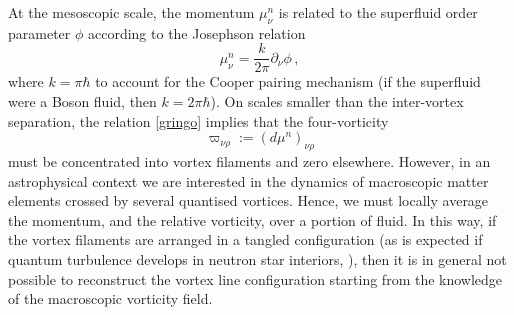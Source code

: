 \documentclass[usenatbib%
]{mnras}
\begin{document}
At the mesoscopic scale, the momentum $\mu^n_\nu$ is related to the superfluid order parameter $\phi$ according to the Josephson relation \citep{Carter2006}
\begin{equation}\label{gringo}
\mu^n_\nu = \dfrac{k}{2\pi} \partial_\nu \phi \, ,
\end{equation}
where $k=\pi \hbar$ to account for the Cooper pairing mechanism (if the superfluid were a Boson fluid, then $k=2\pi \hbar$). 
On scales smaller than the inter-vortex separation, the relation \eqref{gringo} implies that the four-vorticity 
\begin{equation}
\varpi_{\nu \rho} := (d\mu^n)_{\nu \rho}
\end{equation}
must be concentrated into vortex filaments and zero elsewhere.
However, in an astrophysical context we are interested in the dynamics of macroscopic matter elements crossed by several quantised vortices. Hence, we must locally average the momentum, and the relative vorticity, over a portion of fluid. 
In this way, if the vortex filaments are arranged  in a tangled configuration (as is expected if quantum turbulence develops in neutron star interiors, \cite{greenstein70,andersson_turbulence}), then it is in general not possible to reconstruct the vortex line configuration starting from the knowledge of the macroscopic vorticity field. 
\end{document}
